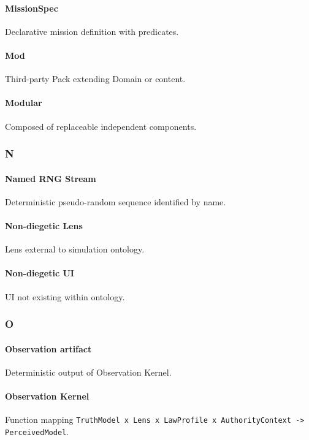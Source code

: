 \documentclass[9pt,a4paper,openany]{book}
\begin{document}
\paragraph{MissionSpec}
Declarative mission definition with predicates.\allowbreak{}


\paragraph{Mod}
Third-\allowbreak{}party Pack extending Domain or content.\allowbreak{}


\paragraph{Modular}
Composed of replaceable independent components.\allowbreak{}


\subsubsection{N}

\paragraph{Named RNG Stream}
Deterministic pseudo-\allowbreak{}random sequence identified by name.\allowbreak{}


\paragraph{Non-diegetic Lens}
Lens external to simulation ontology.\allowbreak{}


\paragraph{Non-diegetic UI}
UI not existing within ontology.\allowbreak{}


\subsubsection{O}

\paragraph{Observation artifact}
Deterministic output of Observation Kernel.\allowbreak{}


\paragraph{Observation Kernel}
Function mapping \texttt{TruthModel x Lens x LawProfile x AuthorityContext -\allowbreak{}> PerceivedModel}.\allowbreak{}
\end{document}
